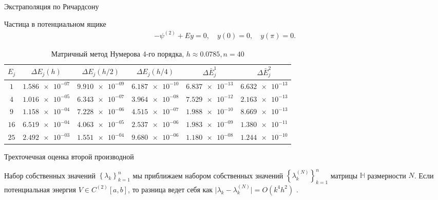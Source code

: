 \documentclass[10pt,pdf,hyperref={unicode},xcolor=dvipsnames]{beamer}
\newcommand{\bbH}{\mathbb{H}}
\newcommand{\lc}{\left\{}
\newcommand{\rc}{\right\}}
\begin{document}
\begin{frame}{Экстраполяция по Ричардсону}
    \begin{block}{Частица в потенциальном ящике}
        \begin{gather}
            -\psi^{(2)} + Ey = 0, \quad y(0) = 0, \quad y(\pi) = 0.
        \end{gather}

        \begin{table}[H]
            \centering
            \caption{Матричный метод Нумерова 4-го порядка, $h \approx 0.0785, n = 40$}
            \begin{tabular}{cccccc}
                \toprule
                $E_j$ & $\Delta E_j(h)$ & $\Delta E_j(h/2)$ & $\Delta E_j(h/4)$ & $\Delta \bar{E}_j^1$ & $\Delta \bar{E}_j^2$ \\
                \midrule
                $1$ & $\num{1.586e-07}$ & $\num{9.910e-09}$ & $\num{6.187e-10}$ & $\num{6.837e-13}$ & $\num{6.632e-13}$ \\
                $4$ & $\num{1.016e-05}$ & $\num{6.343e-07}$ & $\num{3.964e-08}$ & $\num{7.529e-12}$ & $\num{2.163e-13}$ \\
                $9$ & $\num{1.158e-04}$ & $\num{7.228e-06}$ & $\num{4.515e-07}$ & $\num{1.988e-10}$ & $\num{8.669e-13}$ \\
               $16$ & $\num{6.519e-04}$ & $\num{4.063e-05}$ & $\num{2.537e-06}$ & $\num{1.983e-09}$ & $\num{1.380e-11}$ \\
               $25$ & $\num{2.492e-03}$ & $\num{1.551e-04}$ & $\num{9.680e-06}$ & $\num{1.180e-08}$ & $\num{1.244e-10}$ \\
                \bottomrule
            \end{tabular}
        \end{table}
    \end{block}
\end{frame}
\begin{frame}{Трехточечная оценка второй производной}
    \begin{block}{}
        Набор собственных значений $\lc \lambda_k \rc_{k=1}^n$ мы приближаем набором собственных значений $\lc \lambda_k^{(N)} \rc_{k=1}^{n}$ матрицы $\bbH$ размерности $N$. Если потенциальная энергия $V \in C^{(2)}[a, b]$, то разница ведет себя как $\vert \lambda_k - \lambda_k^{(N)} \vert = O( k^4 h^2 )$ . 
    \end{block}
\end{frame}
\end{document}
